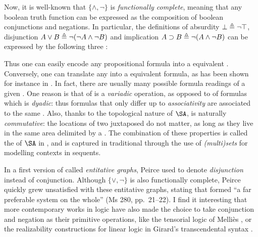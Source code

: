 \AP
Now, it is well-known that $\{\land,\neg\}$ is \emph{functionally complete},
meaning that any boolean truth function can be expressed as the composition of
boolean conjunctions and negations. In particular, the  definitions of
absurdity $\bot \triangleq \neg\top$,  disjunction $A \lor B \triangleq
\neg(\neg A \land \neg B)$ and  implication $A \supset B \triangleq \neg (A
\land \neg B)$ can be expressed by the following three :
Thus one can easily encode any propositional formula into a 
equivalent . Conversely, one can translate any  into a
 equivalent formula, as has been shown for instance in
. In fact, there are usually many
possible formula readings of a given . One reason is that
 of  is a \emph{variadic} operation, as opposed to
 of formulas which is \emph{dyadic}: thus formulas that only
differ up to \emph{associativity} are associated to the same . Also,
thanks to the topological nature of $\SA$,  is naturally
\emph{commutative}: the locations of two juxtaposed  do not matter,
as long as they live in the same area delimited by a . The combination
of these properties is called the  of $\SA$ in
, and is captured in traditional 
through the use of \emph{(multi)sets} for modelling contexts in sequents.

\begin{remark}
  
  In a first version of  called \emph{entitative graphs}, Peirce used
   to denote \emph{disjunction} instead of conjunction.
  Although $\{\lor,\neg\}$ is also functionally complete, Peirce quickly grew
  unsatisfied with these entitative graphs, stating that  formed ``a far
  preferable system on the whole'' (Ms 280, pp.~21--22). I find it interesting
  that more contemporary works in logic have also made the choice to take
  conjunction and negation as their primitive operations, like the tensorial
  logic of Melliès \cite{mellies_micrological_2017}, or the realizability
  constructions for linear logic in Girard's transcendental syntax
  \cite{eng_stellar_2020}.
\end{remark}

